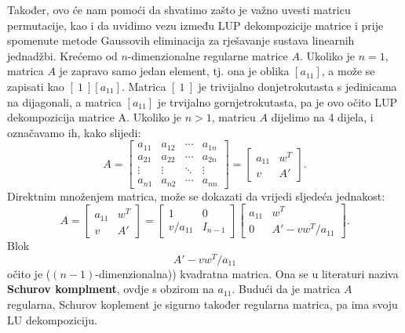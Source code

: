 \documentclass[a4paper,12pt,oneside]{article}
\begin{document}
\noindent Također, ovo će nam pomoći da shvatimo zašto je važno uvesti matricu permutacije, kao i da uvidimo vezu između LUP dekompozicije matrice i prije spomenute metode Gaussovih eliminacija za rješavanje sustava linearnih jednadžbi. \newline\newline
\noindent Krećemo od $n$-dimenzionalne regularne matrice $A$.\newline\newline
\noindent Ukoliko je $n = 1$, matrica $A$ je zapravo samo jedan element, tj. ona je oblika $[a_{11}]$, a može se zapisati kao $[\ 1 \ ][a_{11}]$. Matrica $[\ 1 \ ]$ je trivijalno donjetrokutasta s jedinicama na dijagonali, a matrica $[a_{11}]$ je trvijalno gornjetrokutasta, pa je ovo očito LUP dekompozicija matrice A. \newline \newline
\noindent Ukoliko je $n>1$, matricu $A$ dijelimo na 4 dijela, i označavamo ih, kako slijedi:
$$
A =  \left[\begin{array}{c|ccc}a_{11} & a_{12} & \cdots & a_{1n}\\
	\hline
	a_{21} & a_{22} & \cdots & a_{2n}\\
	\vdots & \vdots & \ddots & \vdots\\
	a_{n1} & a_{n2} & \cdots &a_{nn}\end{array}\right]  =  \left[\begin{array}{cc}a_{11} & w^{T} \\
	v & A' \end{array}\right].
$$
Direktnim množenjem matrica, može se dokazati da vrijedi sljedeća jednakost:
$$
	A = \left[\begin{array}{cc}a_{11} & w^{T} \\
		v & A' \end{array}\right] =  \left[\begin{array}{cc}1 & 0 \\
		v/a_{11} &I_{n-1} \end{array}\right]  \left[\begin{array}{cc}a_{11} & w^T \\
		0 &A' - vw^T/a_{11}\end{array}\right].
$$
Blok
$$A' - vw^T/a_{11}$$
očito je ($(n-1)$-dimenzionalna)) kvadratna matrica. Ona se u literaturi naziva \textbf{Schurov komplment}, ovdje s obzirom na $a_{11}$.
\newline \newline
\noindent Budući da je matrica $A$ regularna, Schurov koplement je sigurno također regularna matrica, pa ima svoju LU dekompoziciju. \newline\newline
\end{document}
